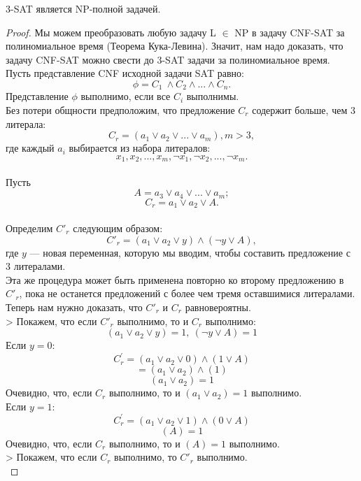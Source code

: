     
    
    \begin{Thm}
        3-SAT является NP-полной задачей.
    \end{Thm}
    
    \begin{proof}
        Мы можем преобразовать любую задачу L $\in$ NP в задачу CNF-SAT за полиномиальное время (Теорема Кука-Левина). Значит, нам надо доказать, что задачу CNF-SAT можно свести до 3-SAT задачи за полиномиальное время.\\
        Пусть представление CNF исходной задачи SAT равно:
        $$\phi = C_1 \ \wedge C_2 \wedge ... \wedge C_n.$$ Представление $\phi$ выполнимо, если все $C_i$ выполнимы.\\
        Без потери общности предположим, что предложение $C_r$ содержит больше, чем 3 литерала:
        $$C_r = (a_1 \vee a_2 \vee ... \vee a_m), m>3,$$ где каждый $a_i$ выбирается из набора литералов:  $$x_1, x_2, ...,x_m, \neg x_1, \neg x_2, ..., \neg x_m.$$\\
        Пусть $$A = a_3 \vee a_4 \vee ... \vee a_m;$$
        $$C_r = a_1 \vee a_2 \vee A.$$\\
        Определим $C'_r$ следующим образом:
        $$C'_r = (a_1 \vee a_2 \vee y) \wedge (\neg y \vee A),$$ где $y$ --- новая переменная, которую мы вводим, чтобы составить предложение с 3 литералами.\\
        Эта же процедура может быть применена повторно ко второму предложению в $C'_r$, пока не останется предложений с более чем тремя оставшимися литералами.\\
        Теперь нам нужно доказать, что $C'_r$ и $C_r$ равновероятны.\\
        > Покажем, что если $C'_r$ выполнимо, то и $C_r$ выполнимо:
        $$(a_1 \vee a_2 \vee y)=1,\ (\neg y \vee A) = 1$$
        Если $y = 0$:
        $$C_r^\prime = (a_1 \vee a_2 \vee 0) \wedge (1 \vee A)$$
        $$ = (a_1 \vee a_2) \wedge (1) $$
        $$(a_1 \vee a_2) = 1$$
        Очевидно, что, если $C_r$ выполнимо, то и $(a_1 \vee a_2) = 1$ выполнимо.\\
        Если $y=1$:
        $$C_r^\prime = (a_1 \vee a_2 \vee 1) \wedge (0 \vee A)$$
        $$(A) = 1$$
        Очевидно, что, если $C_r$ выполнимо, то и $(A) = 1$ выполнимо.\\
        > Покажем, что если $C_r$ выполнимо, то $C'_r$ выполнимо.\\

\end{proof}

